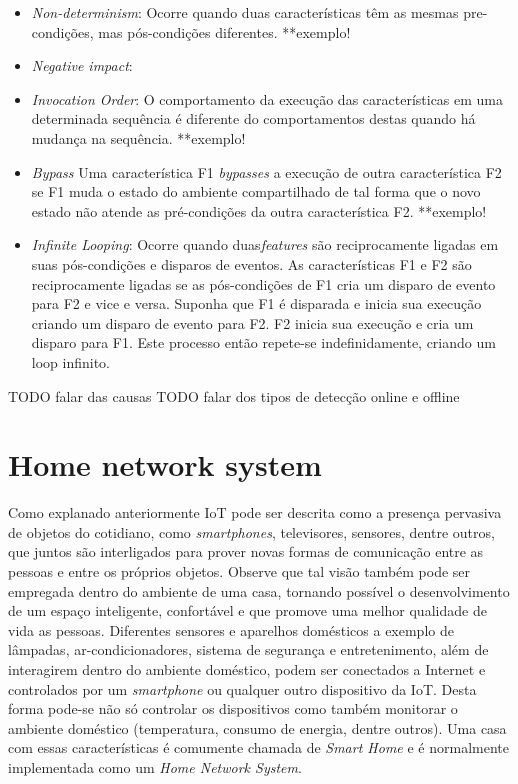 \begin{itemize}
\item \textit{Non-determinism}: Ocorre quando duas características têm as mesmas pre-condições, mas pós-condições diferentes. **exemplo!
\item \textit{Negative impact}: 
\item \textit{Invocation Order}: O comportamento da execução das características em uma determinada sequência é diferente do comportamentos destas quando há mudança na sequência. **exemplo!
\item \textit{Bypass} Uma característica F1 \textit{bypasses} a execução de outra característica F2 se F1 muda o estado do ambiente compartilhado de tal forma que o novo estado não atende as pré-condições da outra característica F2. **exemplo!
\item \textit{Infinite Looping}: Ocorre quando duas\textit{features} são reciprocamente ligadas em suas pós-condições e disparos de eventos. As características F1 e F2 são reciprocamente ligadas se as pós-condições de F1 cria um disparo de evento para F2 e vice e versa. Suponha que F1 é disparada e inicia sua execução criando um disparo de evento para F2. F2 inicia sua execução e cria um disparo para F1. Este processo então repete-se indefinidamente, criando um loop infinito.  
\end{itemize}

TODO falar das causas \cite{Weiss:2005}
TODO falar dos tipos de detecção online e offline \cite{Calder:2003}

\section{Home network system}
\label{sec:hns}
Como explanado anteriormente IoT pode ser descrita como a presença pervasiva de objetos do cotidiano, como \textit{smartphones}, televisores, sensores, dentre outros, que juntos são interligados para prover novas formas de comunicação entre as pessoas e entre os próprios objetos. Observe que tal visão também pode ser empregada dentro do ambiente de uma casa, tornando possível o desenvolvimento de um espaço inteligente, confortável e que promove uma melhor qualidade de vida as pessoas. Diferentes sensores e aparelhos domésticos a exemplo de lâmpadas, ar-condicionadores, sistema de segurança e entretenimento, além de interagirem dentro do ambiente doméstico, podem ser conectados a Internet e controlados por um \textit{smartphone} ou qualquer outro dispositivo da IoT. Desta forma pode-se não só controlar os dispositivos como também monitorar o ambiente doméstico (temperatura, consumo de energia, dentre outros). Uma casa com essas características é comumente chamada de \textit{Smart Home} e é normalmente implementada como um \textit{Home Network System}.\cite{Piyare:2013}

